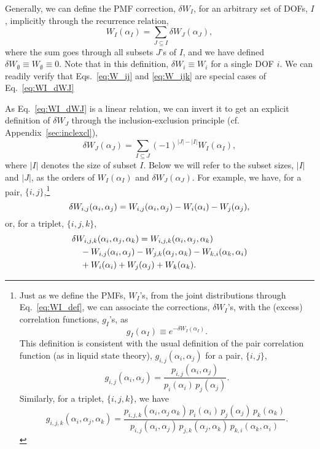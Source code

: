 \documentclass[reprint, superscriptaddress]{revtex4-1}
\begin{document}
Generally, we can define the PMF correction, $\delta W_I$,
for an arbitrary set of DOFs, $I$,
implicitly through the recurrence relation,
%
\begin{equation}
  W_I(\alpha_I)
  =
  \sum_{J \subseteq I}
  \delta W_J(\alpha_J)
  ,
  \label{eq:WI_dWJ}
\end{equation}
%
where the sum goes through all subsets $J$'s of $I$,
and we have defined
$\delta W_\emptyset \equiv W_\emptyset \equiv 0$.
%
Note that in this definition,
$\delta W_i \equiv W_i$
for a single DOF $i$.
%
We can readily verify that
Eqs.~\eqref{eq:W_ij} and \eqref{eq:W_ijk}
are special cases of Eq.~\eqref{eq:WI_dWJ}

As Eq.~\eqref{eq:WI_dWJ} is a linear relation,
we can invert it to get an explicit definition of $\delta W_J$
through the inclusion-exclusion principle\cite{bjorklund2007}
(cf. Appendix~\ref{sec:inclexcl}),
%
\begin{equation}
  \delta W_J(\alpha_J)
  =
  \sum_{I \subseteq J}
  (-1)^{|J| - |I|}
  W_I(\alpha_I)
  ,
  \label{eq:dWJ_WI}
\end{equation}
%
where $|I|$ denotes the size of subset $I$.
%
Below we will refer to the subset sizes, $|I|$ and $|J|$,
as the orders of $W_I(\alpha_I)$ and $\delta W_J(\alpha_J)$.
%
For example, we have, for a pair, $\{i, j\}$,\footnote{
  Just as we define the PMFs, $W_I$'s, from the joint distributions
  through Eq.~\eqref{eq:WI_def},
  we can associate the corrections, $\delta W_I$'s,
  with the (excess) correlation functions, $g_I$'s, as
  $$
  g_I(\alpha_I) \equiv e^{-\delta W_I(\alpha_I)}
  .
  $$
  This definition is consistent with the usual definition
  of the pair correlation function (as in liquid state theory\cite{hansen}),
  $g_{i,j}(\alpha_i, \alpha_j)$ for a pair, $\{i, j\}$,
  $$
    g_{i,j}(\alpha_i, \alpha_j)
    =
    \frac{ p_{i,j}(\alpha_i, \alpha_j) } { p_i(\alpha_i) \, p_j(\alpha_j) }
    .
  $$
  Similarly, for a triplet, $\{i, j, k\}$, we have
  $$
  g_{i,j,k}(\alpha_i, \alpha_j, \alpha_k)
  =
  \frac{ p_{i,j,k}(\alpha_i, \alpha_j \, \alpha_k) \, p_i(\alpha_i) \, p_j(\alpha_j) \, p_k(\alpha_k) }{ p_{i,j}(\alpha_i, \alpha_j) \, p_{j,k}(\alpha_j, \alpha_k) \, p_{k,i}(\alpha_k, \alpha_i) }
  .
  $$
}
%
\begin{equation}
  \delta W_{i,j}(\alpha_i, \alpha_j)
  =
  W_{i,j}(\alpha_i, \alpha_j)
  - W_{i}(\alpha_i) - W_{j}(\alpha_j)
  ,
  \notag
\end{equation}
%
or, for a triplet, $\{i, j, k\}$,
%
\begin{align*}
  &\delta W_{i,j,k}(\alpha_i, \alpha_j, \alpha_k)
  =
  W_{i,j,k}(\alpha_i, \alpha_j, \alpha_k)
  \notag\\
  &\quad
  - W_{i,j}(\alpha_i, \alpha_j)
  - W_{j,k}(\alpha_j, \alpha_k)
  - W_{k,i}(\alpha_k, \alpha_i)
  \notag\\
  &\quad
  + W_i(\alpha_i)
  + W_j(\alpha_j)
  + W_k(\alpha_k)
  .
\end{align*}
\end{document}
